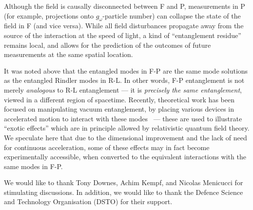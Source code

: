 \documentclass[aps,prl,twocolumn,showpacs]{revtex4}
\begin{document}
Although the field is causally disconnected between F and P, measurements in P (for example, projections onto $g_{\omega}$-particle number) can collapse the state of the field in F (and vice versa).  While all field disturbances propagate away from the source of the interaction at the speed of light, a kind of ``entanglement residue'' remains local, and allows for the prediction of the outcomes of future measurements at the same spatial location.

It was noted above that the entangled modes in F-P are the same mode solutions as the entangled Rindler modes in R-L.  In other words, F-P entanglement is not merely \emph{analogous} to R-L entanglement \---- it is \emph{precisely the same entanglement}, viewed in a different region of spacetime.  Recently, theoretical work has been focused on manipulating vacuum entanglement, by placing various devices in accelerated motion to interact with these modes~\cite{alsing1, bradler1, reznik1, mann1, lin1, han1} \---- these are used to illustrate ``exotic effects'' which are in principle allowed by relativistic quantum field theory.  We speculate here that due to the dimensional improvement and the lack of need for continuous acceleration, some of these effects may in fact become experimentally accessible, when converted to the equivalent interactions with the same modes in F-P.

We would like to thank Tony Downes, Achim Kempf, and Nicolas Menicucci for stimulating discussions.  In addition, we would like to thank the Defence Science and Technology Organisation (DSTO) for their support.

{}

 
\end{document}
